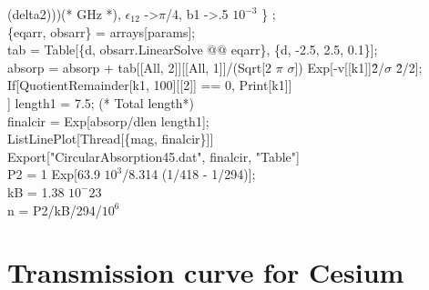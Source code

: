 \begin{enumerate}
(delta2)))(* GHz *), $\epsilon_{12}$ -\textgreater $\pi$/4, b1 -\textgreater  .5 $10^{-3}$ \} ;\\
 \{eqarr, obsarr\} = arrays[params];\\
   tab = Table[\{d, obsarr.LinearSolve @@ eqarr\}, \{d, -2.5, 2.5, 0.1\}];\\
 absorp = 
  absorp + tab[[All, 2]][[All, 
      1]]/(Sqrt[2 $\pi$ $\sigma$]) Exp[-v[[k1]]\^ 2/$\sigma$ \^ 2/2];\\
 If[QuotientRemainder[k1, 100][[2]] == 0, Print[k1]]\\ ]
length1 = 7.5; (* Total length*)\\
finalcir = Exp[absorp/dlen length1];\\
ListLinePlot[Thread[\{mag, finalcir\}]]\\
Export["CircularAbsorption45.dat", finalcir, "Table"]\\
P2 = 1 Exp[63.9 $10^3$/8.314 (1/418 - 1/294)];\\
kB = 1.38 $10^-{23}$\\
n = P2/kB/294/$10^6$ \\

\section{Transmission curve for Cesium}


\end{enumerate}
